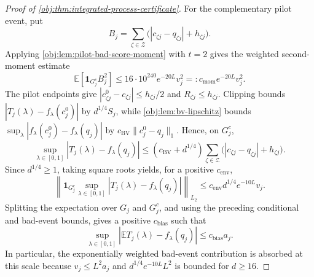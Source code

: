 \documentclass[11pt]{article}
\begin{document}
\begin{proof}[Proof of \cref{obj:thm:integrated-process-certificate}]
For the complementary pilot event, put
\[
B_j=\sum_{\zeta\in\mathcal Z}
 \bigl(|c_{\zeta j}-q_{\zeta j}|+h_{\zeta j}\bigr).
\]
Applying \cref{obj:lem:pilot-bad-score-moment} with \(t=2\) gives the weighted second-moment estimate
\[
\mathbb E[\mathbf1_{G_j^c}B_j^2]
\leq 16\cdot10^{240}e^{-20L}v_j^2
=:c_{\mathrm{mom}}e^{-20L}v_j^2.
\]
The pilot endpoints give \(|c^0_{\zeta j}-c_{\zeta j}|\leq h_{\zeta j}/2\) and \(R_{\zeta j}\leq h_{\zeta j}\). Clipping bounds \(|T_j(\lambda)-f_\lambda(c_j^0)|\) by \(d^{1/4}S_j\), while \cref{obj:lem:bv-lipschitz} bounds \(\sup_\lambda|f_\lambda(c_j^0)-f_\lambda(q_j)|\) by \(c_{\mathrm{BV}}\|c_j^0-q_j\|_1\). Hence, on \(G_j^c\),
\[
\sup_{\lambda\in[0,1]}|T_j(\lambda)-f_\lambda(q_j)|
 \leq(c_{\mathrm{BV}}+d^{1/4})
 \sum_{\zeta\in\mathcal Z}
 \bigl(|c_{\zeta j}-q_{\zeta j}|+h_{\zeta j}\bigr).
\]
Since \(d^{1/4}\geq1\), taking square roots yields, for a positive \(c_{\mathrm{env}}\),
\[
\left\|\mathbf1_{G_j^c}
 \sup_{\lambda\in[0,1]}|T_j(\lambda)-f_\lambda(q_j)|
 \right\|_{L_2}
 \leq c_{\mathrm{env}}d^{1/4}e^{-10L}v_j.
\]
Splitting the expectation over \(G_j\) and \(G_j^c\), and using the preceding conditional and bad-event bounds, gives a positive \(c_{\mathrm{bias}}\) such that
\[
\sup_{\lambda\in[0,1]}
 \left|\mathbb ET_j(\lambda)-f_\lambda(q_j)\right|
 \leq c_{\mathrm{bias}}a_j.
\]
In particular, the exponentially weighted bad-event contribution is absorbed at this scale because \(v_j\leq L^2a_j\) and
\(d^{1/4}e^{-10L}L^2\) is bounded for \(d\geq16\). %


\end{proof}
\end{document}
